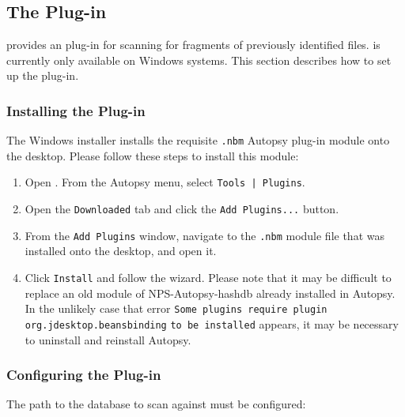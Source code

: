 \documentclass[11pt,fleqn]{article} %
\begin{document}
\subsection{The \sscope \aut Plug-in}
\sscope provides an \aut plug-in for scanning for fragments of previously identified files. \aut is currently only available on Windows systems. This section describes how to set up the \sscope \aut plug-in.

\subsubsection{Installing the \sscope Plug-in}
The \sscope Windows installer installs the requisite \verb+.nbm+ Autopsy plug-in module onto the desktop. Please follow these steps to install this module:

\begin{enumerate}
\item Open \aut. From the Autopsy menu, select \verb+Tools | Plugins+.
\item Open the \verb+Downloaded+ tab and click the \verb+Add Plugins...+ button.
\item From the \verb+Add Plugins+ window, navigate to the \verb+.nbm+ module file that was installed onto the desktop, and open it.
\item Click \verb+Install+ and follow the wizard. Please note that it may be difficult to replace an old module of NPS-Autopsy-hashdb already installed in Autopsy. In the unlikely case that error \verb+Some plugins require plugin org.jdesktop.beansbinding+ \verb+to be installed+ appears, it may be necessary to uninstall and reinstall Autopsy.
\end{enumerate}

\subsubsection{Configuring the \sscope Plug-in}
The path to the \hdb database to scan against must be configured:
\end{document}
